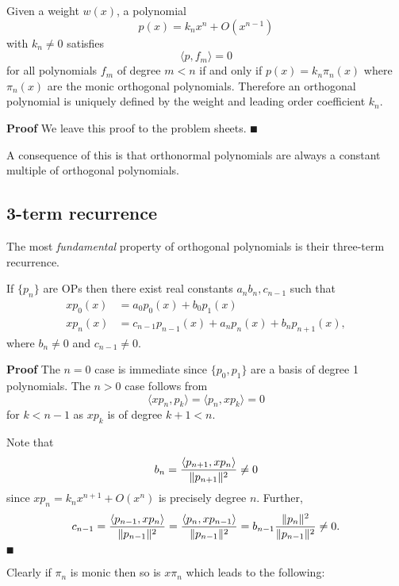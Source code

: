 \begin{theorem} Given a weight $w(x)$, a polynomial
\[
p(x) = k_n x^n + O(x^{n-1})
\]
with $k_n \ensuremath{\neq} 0$ satisfies
\[
\ensuremath{\langle}p,f_m\ensuremath{\rangle} = 0
\]
for all  polynomials $f_m$ of degree $m < n$ if and only if $p(x) = k_n \ensuremath{\pi}_n(x)$ where $\ensuremath{\pi}_n(x)$ are the monic orthogonal polynomials. Therefore an orthogonal polynomial is uniquely defined by the weight and leading order coefficient $k_n$.

\end{theorem}
\textbf{Proof} We leave this proof to the problem sheets. \ensuremath{\QED}

A consequence of this is that orthonormal polynomials are always a constant multiple of orthogonal polynomials.

\subsection{3-term recurrence}
The most \emph{fundamental} property of orthogonal polynomials is their three-term recurrence.

\begin{theorem} If $\{p_n\}$ are OPs then there exist real constants $a_n b_n, c_{n-1}$ such that
\begin{align*}
x p_0(x) &= a_0 p_0(x) + b_0 p_1(x)  \\
x p_n(x) &= c_{n-1} p_{n-1}(x) + a_n p_n(x) + b_n p_{n+1}(x),
\end{align*}
where $b_n \ensuremath{\neq}0$ and $c_{n-1} \ensuremath{\neq}0$. \end{theorem}
\textbf{Proof} The $n=0$ case is immediate since $\{p_0,p_1\}$ are a basis of degree 1 polynomials. The $n >0$ case follows from
\[
\ensuremath{\langle}x p_n, p_k\ensuremath{\rangle} = \ensuremath{\langle} p_n, xp_k\ensuremath{\rangle} = 0
\]
for $k < n-1$ as $x p_k$ is of degree $k+1 < n$.

Note that
\[
b_n = {\ensuremath{\langle}p_{n+1}, x p_n\ensuremath{\rangle} \over \|p_{n+1} \|^2} \ensuremath{\neq} 0
\]
since $x p_n = k_n x^{n+1} + O(x^n)$ is precisely degree $n$. Further,
\[
c_{n-1} = {\ensuremath{\langle}p_{n-1}, x p_n\ensuremath{\rangle} \over \|p_{n-1}\|^2 } =
{\ensuremath{\langle}p_n, x p_{n-1}\ensuremath{\rangle}  \over \|p_{n-1}\|^2 } =  b_{n-1}{\|p_n\|^2  \over \|p_{n-1}\|^2 } \ensuremath{\neq} 0.
\]
\ensuremath{\QED}

Clearly if $\ensuremath{\pi}_n$ is monic then so is $x \ensuremath{\pi}_n$ which leads to the following:


